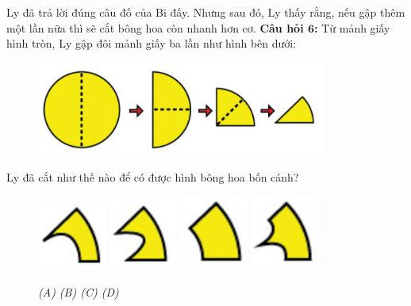 Ly đã trả lời đúng câu đố của Bi đấy. Nhưng sau đó, Ly thấy rằng, nếu gập thêm một lần nữa thì sẽ cắt bông hoa còn nhanh hơn cơ.
\vskip0.25cm
\textbf{\color{toancuabi}Câu hỏi $\pmb{6}$:} Từ mảnh giấy hình tròn, Ly gập đôi mảnh giấy ba lần như hình bên dưới: 
\begin{figure}[H]
	\vspace*{-10pt}
	\captionsetup{labelformat=empty}
	\centering
	\captionsetup{justification=raggedleft}
	\includegraphics[width =0.85\textwidth]{cat-14}
\end{figure}	
Ly  đã cắt như thế nào để có được hình bông hoa bốn cánh?
\begin{figure}[H]
	\centering
	\captionsetup{labelformat=empty}
	\vspace*{-10pt}
	\captionsetup{justification=centering}
	\includegraphics[width =0.2\textwidth]{cat-15a}
	\hfill
	\includegraphics[width =0.2\textwidth]{cat-15b}
	\hfill
	\includegraphics[width =0.2\textwidth]{cat-15c}
	\hfill
	\includegraphics[width =0.2\textwidth]{cat-15d}	
	\caption{\small \it (A)\hspace*{40pt} (B)\hspace*{65pt} (C) \hspace*{40pt} (D)}
	\vspace*{-10pt}
\end{figure}
